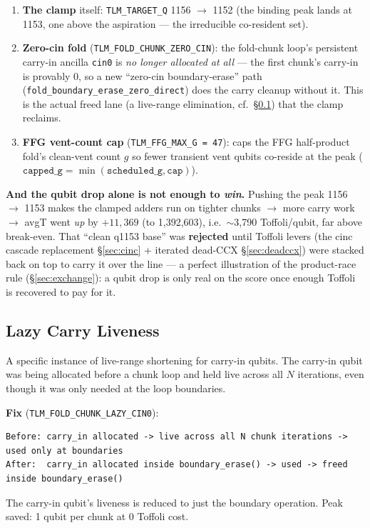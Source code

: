 \documentclass[11pt,a4paper]{article}
\begin{document}
\begin{enumerate}
  \item \textbf{The clamp} itself: \texttt{TLM\_TARGET\_Q} 1156 $\to$ 1152 (the binding peak lands
    at 1153, one above the aspiration --- the irreducible co-resident set).
  \item \textbf{Zero-cin fold} (\texttt{TLM\_FOLD\_CHUNK\_ZERO\_CIN}): the fold-chunk loop's
    persistent carry-in ancilla \texttt{cin0} is \emph{no longer allocated at all} --- the first
    chunk's carry-in is provably 0, so a new ``zero-cin boundary-erase'' path
    (\lstinline{fold_boundary_erase_zero_direct}) does the carry cleanup without it. This is the
    actual freed lane (a live-range elimination, cf.\ \S\ref{sec:lazycarry}) that the clamp reclaims.
  \item \textbf{FFG vent-count cap} (\texttt{TLM\_FFG\_MAX\_G = 47}): caps the FFG half-product
    fold's clean-vent count $g$ so fewer transient vent qubits co-reside at the peak
    ($\texttt{capped\_g} = \min(\texttt{scheduled\_g}, \texttt{cap})$).
\end{enumerate}

\textbf{And the qubit drop alone is not enough to \emph{win}.} Pushing the peak 1156 $\to$ 1153
makes the clamped adders run on tighter chunks $\to$ more carry work $\to$ avgT went \emph{up} by
$+11{,}369$ (to 1{,}392{,}603), i.e.\ $\sim$3{,}790 Toffoli/qubit, far above break-even. That
``clean q1153 base'' was \textbf{rejected} until Toffoli levers (the cinc cascade replacement
\S\ref{sec:cinc} + iterated dead-CCX \S\ref{sec:deadccx}) were stacked back on top to carry it over
the line --- a perfect illustration of the product-race rule (\S\ref{sec:exchange}): a qubit drop is
only real on the score once enough Toffoli is recovered to pay for it.

\subsection{Lazy Carry Liveness}
\label{sec:lazycarry}

A specific instance of live-range shortening for carry-in qubits. The carry-in qubit was being
allocated before a chunk loop and held live across all $N$ iterations, even though it was only
needed at the loop boundaries.

\textbf{Fix} (\texttt{TLM\_FOLD\_CHUNK\_LAZY\_CIN0}):
\begin{lstlisting}
Before: carry_in allocated -> live across all N chunk iterations -> used only at boundaries
After:  carry_in allocated inside boundary_erase() -> used -> freed inside boundary_erase()
\end{lstlisting}
The carry-in qubit's liveness is reduced to just the boundary operation.
Peak saved: 1 qubit per chunk at 0 Toffoli cost.
\end{document}

